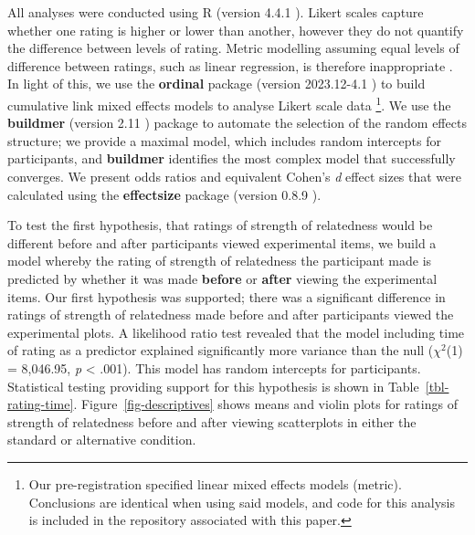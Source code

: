 \documentclass[manuscript,screen,review,anonymous]{acmart}
\begin{document}
All analyses were conducted using R (version 4.4.1 \citep{rcore}).
Likert scales capture whether one rating is higher or lower than
another, however they do not quantify the difference between levels of
rating. Metric modelling assuming equal levels of difference between
ratings, such as linear regression, is therefore inappropriate
\citep{liddell_2018}. In light of this, we use the \textbf{ordinal}
package (version 2023.12-4.1 \citep{ordinal}) to build cumulative link
mixed effects models to analyse Likert scale data \footnote{Our
  pre-registration specified linear mixed effects models (metric).
  Conclusions are identical when using said models, and code for this
  analysis is included in the repository associated with this paper.}.
We use the \textbf{buildmer} (version 2.11 \citep{buildmer}) package to
automate the selection of the random effects structure; we provide a
maximal model, which includes random intercepts for participants, and
\textbf{buildmer} identifies the most complex model that successfully
converges. We present odds ratios and equivalent Cohen's \emph{d} effect
sizes that were calculated using the \textbf{effectsize} package
(version 0.8.9 \citep{effectsize}).

To test the first hypothesis, that ratings of strength of relatedness
would be different before and after participants viewed experimental
items, we build a model whereby the rating of strength of relatedness
the participant made is predicted by whether it was made \textbf{before}
or \textbf{after} viewing the experimental items. Our first hypothesis
was supported; there was a significant difference in ratings of strength
of relatedness made before and after participants viewed the
experimental plots. A likelihood ratio test revealed that the model
including time of rating as a predictor explained significantly more
variance than the null (\(\chi^2\)(1) = 8,046.95, \emph{p} \textless{}
.001). This model has random intercepts for participants. Statistical
testing providing support for this hypothesis is shown in
Table~\ref{tbl-rating-time}. Figure~\ref{fig-descriptives} shows means
and violin plots for ratings of strength of relatedness before and after
viewing scatterplots in either the standard or alternative condition.

\begin{table}

\caption{\label{tbl-rating-time}Statistics for the significant main
effect of rating time. Odds ratio and the equivalent Cohen's \textit{d}
value is also supplied.}


\end{table}%
\end{document}
